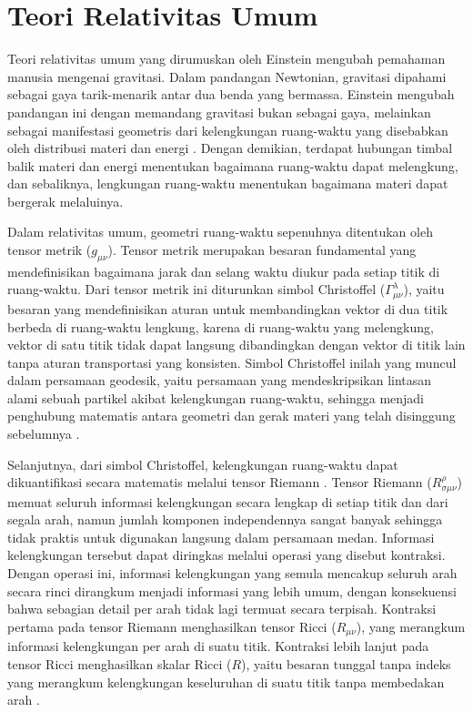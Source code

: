 \section{Teori Relativitas Umum}
\label{sec:relativitas-umum}

\noindent Teori relativitas umum yang dirumuskan oleh Einstein mengubah pemahaman manusia mengenai gravitasi. 
Dalam pandangan Newtonian, gravitasi dipahami sebagai gaya tarik-menarik antar dua benda yang bermassa.
Einstein mengubah pandangan ini dengan memandang gravitasi bukan sebagai gaya, melainkan sebagai 
manifestasi geometris dari kelengkungan ruang-waktu yang disebabkan oleh distribusi materi dan energi 
\parencite{Einstein1916}. Dengan demikian, terdapat hubungan timbal balik materi dan energi menentukan 
bagaimana ruang-waktu dapat melengkung, dan sebaliknya, lengkungan ruang-waktu menentukan bagaimana materi 
dapat bergerak melaluinya.

Dalam relativitas umum, geometri ruang-waktu sepenuhnya ditentukan oleh tensor metrik 
($g_{\mu\nu}$). Tensor metrik merupakan besaran fundamental yang mendefinisikan bagaimana 
jarak dan selang waktu diukur pada setiap titik di ruang-waktu. Dari tensor metrik ini 
diturunkan simbol Christoffel ($\Gamma^\lambda_{\mu\nu}$), yaitu besaran yang mendefinisikan 
aturan untuk membandingkan vektor di dua titik berbeda di ruang-waktu lengkung, karena di 
ruang-waktu yang melengkung, vektor di satu titik tidak dapat langsung dibandingkan dengan 
vektor di titik lain tanpa aturan transportasi yang konsisten. Simbol Christoffel inilah 
yang muncul dalam persamaan geodesik, yaitu persamaan yang mendeskripsikan lintasan alami 
sebuah partikel akibat kelengkungan ruang-waktu, sehingga menjadi penghubung matematis 
antara geometri dan gerak materi yang telah disinggung sebelumnya 
\parencite{Wald1984, Carroll2004}.

Selanjutnya, dari simbol Christoffel, kelengkungan ruang-waktu dapat dikuantifikasi secara 
matematis melalui tensor Riemann \parencite{Wald1984}. Tensor Riemann ($R^\rho_{\sigma\mu\nu}$) memuat seluruh 
informasi kelengkungan secara lengkap di setiap titik dan dari segala arah, namun jumlah 
komponen independennya sangat banyak sehingga tidak praktis untuk digunakan langsung dalam 
persamaan medan. Informasi kelengkungan tersebut dapat diringkas melalui operasi yang disebut kontraksi. 
Dengan operasi ini, informasi kelengkungan yang semula 
mencakup seluruh arah secara rinci dirangkum menjadi informasi yang lebih umum, dengan 
konsekuensi bahwa sebagian detail per arah tidak lagi termuat secara terpisah. 
Kontraksi pertama pada tensor Riemann menghasilkan tensor Ricci 
($R_{\mu\nu}$), yang merangkum informasi kelengkungan per arah di suatu titik. Kontraksi 
lebih lanjut pada tensor Ricci menghasilkan skalar Ricci ($R$), yaitu besaran tunggal tanpa 
indeks yang merangkum kelengkungan keseluruhan di suatu titik tanpa membedakan arah 
\parencite{Carroll2004, Misner1973}.

